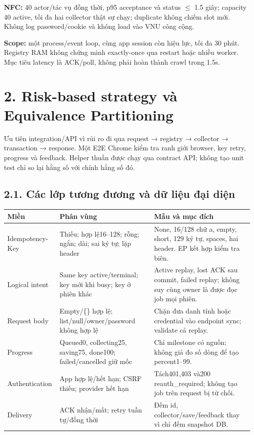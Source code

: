 \documentclass[10pt,a4paper]{article}
\begin{document}
\textbf{NFC:} 40 actor/tác vụ đồng thời, p95 acceptance và status \ensuremath{\leq} 1.5 giây;
capacity 40 active, tối đa hai collector thật sự chạy; duplicate không chiếm slot mới.
Không log password/cookie và không load vào VNU công cộng.

\textbf{Scope:} một process/event loop, cùng app session còn hiệu lực, tối đa 30 phút.
Registry RAM không chứng minh exactly-once qua restart hoặc nhiều worker.
Mục tiêu latency là ACK/poll, không phải hoàn thành crawl trong 1.5s.
\clearpage

\section*{2. Risk-based strategy và Equivalence Partitioning}
Ưu tiên integration/API vì rủi ro đi qua request → registry → collector → transaction → response.
Một E2E Chrome kiểm tra ranh giới browser, key retry, progress và feedback. Helper thuần được chạy qua contract API;
không tạo unit test chỉ so lại hằng số với chính hằng số đó.

\subsection*{2.1. Các lớp tương đương và dữ liệu đại diện}
\par\begingroup\small
\begin{tabularx}{\linewidth}{@{}p{28mm}Y Y@{}}
\toprule{}\textbf{Miền} & \textbf{Phân vùng} & \textbf{Mẫu và mục đích}\\\midrule
Idempotency-Key & Thiếu; hợp lệ16–128; rỗng; ngắn; dài; sai ký tự; lặp header & None, 16/128 chữ a, empty, short, 129 ký tự, spaces, hai header. EP kết hợp kiểm tra biên.\\
Logical intent & Same key active/terminal; key mới khi busy; key ở phiên khác & Active replay, lost ACK sau commit, failed replay; không suy cùng owner là được đọc job mọi phiên.\\
Request body & Empty/\{\} hợp lệ; list/null/owner/password không hợp lệ & Chặn đưa danh tính hoặc credential vào endpoint sync; validate cả replay.\\
Progress & Queued0, collecting25, saving75, done100; failed/cancelled giữ mốc & Chỉ milestone có nguồn; không giả đo số dòng để tạo percent1–99.\\
Authentication & App hợp lệ/hết hạn; CSRF thiếu; provider hết hạn & Tách401,403 và200 reauth\_required; không tạo job trên request bị từ chối.\\
Delivery & ACK nhận/mất; retry tuần tự/đồng thời & Đếm id, collector/save/feedback thay vì chỉ đếm snapshot DB.\\
\bottomrule
\end{tabularx}\endgroup\par
\end{document}
